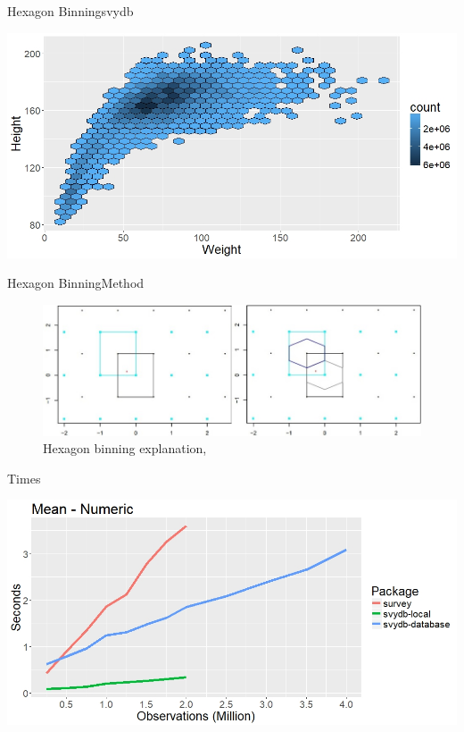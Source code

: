 \documentclass{beamer}
\begin{document}
\begin{frame}[fragile]{Hexagon Binning}{svydb}
\pause
\begin{center}
    \includegraphics[scale = 0.45]{img/hex-e.jpeg}
\end{center}
\end{frame}


\begin{frame}{Hexagon Binning}{Method}
\begin{figure}[H]
\centering
    \includegraphics[scale = 0.45]{img/hex-e13.jpg}
    \caption{Hexagon binning explanation, \citep{hexbinfig}}
    \label{fig:hex-e1}
\end{figure}
\end{frame}



\begin{frame}{Times}
\pause
\begin{center}
    \includegraphics[scale = 0.45]{img/meannum-r.jpeg}
\end{center}
\end{frame}
\end{document}
